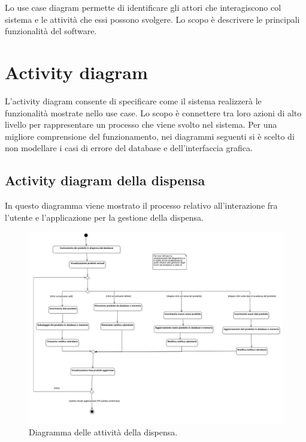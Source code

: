 Lo use case diagram permette di identificare gli attori che interagiscono col sistema e le attività che essi possono svolgere. Lo scopo è descrivere le principali funzionalità del software.

\newpage

\section{Activity diagram}

L'activity diagram consente di specificare come il sistema realizzerà le funzionalità mostrate nello use case. Lo scopo è connettere tra loro azioni di alto livello per rappresentare un processo che viene svolto nel sistema. Per una migliore comprensione del funzionamento, nei diagrammi seguenti si è scelto di non modellare i casi di errore del database e dell'interfaccia grafica. 

\subsection{Activity diagram della dispensa}

In questo diagramma viene mostrato il processo relativo all'interazione fra l'utente e l'applicazione per la gestione della dispensa. 

\begin{figure}[H]
    \includegraphics[width=\linewidth]{images/activity-pantry.png}
    \caption{Diagramma delle attività della dispensa.}
    \label{fig:actpantry}
\end{figure}

\newpage

